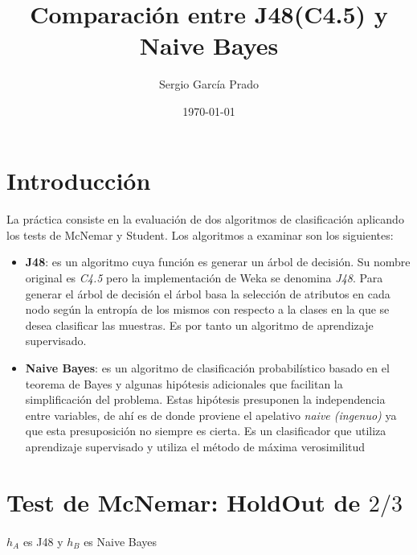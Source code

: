 \documentclass[10pt, a4paper,spanish]{article}
\title{\vspace{-15mm}\fontsize{24pt}{10pt}\selectfont\textbf{Comparación entre J48(C4.5) y Naive Bayes}} %
\author{Sergio García Prado}
\date{\today}
\begin{document}
	\maketitle %

	\thispagestyle{fancy} %


	\section{Introducción}
        \paragraph{}
		La práctica consiste en la evaluación de dos algoritmos de clasificación aplicando los tests de McNemar y Student. Los algoritmos a examinar son los siguientes:

		\begin{itemize}

			\item \textbf{J48}: es un algoritmo cuya función es generar un árbol de decisión. Su nombre original es \emph{C4.5} pero la implementación de Weka se denomina \emph{J48}. Para generar el árbol de decisión el árbol basa la selección de atributos en cada nodo según la entropía de los mismos con respecto a la clases en la que se desea clasificar las muestras. Es por tanto un algoritmo de aprendizaje supervisado.

			\item \textbf{Naive Bayes}: es un algoritmo de clasificación probabilístico basado en el teorema de Bayes y algunas hipótesis adicionales que facilitan la simplificación del problema. Estas hipótesis presuponen la independencia entre variables, de ahí es de donde proviene el apelativo \emph{naive (ingenuo)} ya que esta presuposición no siempre es cierta. Es un clasificador que utiliza aprendizaje supervisado y utiliza el método de máxima verosimilitud

		\end{itemize}

	\section{Test de McNemar: HoldOut de $2/3$}

        \paragraph{}
		$h_A$ es J48 y $h_B$ es Naive Bayes
\end{document}
